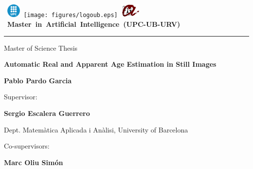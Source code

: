 \thispagestyle{empty}
\vspace*{-2cm}

\hbox{
\includegraphics[width=0.7cm]{figures/logoupc.eps}
\texttt{[image: figures/logoub.eps]}
\includegraphics[width=1cm]{figures/logourv.eps}
\Large \bf Master in Artificial Intelligence (UPC-UB-URV)}
\hrule

\bigskip\bigskip\bigskip

\begin{center}

{\LARGE Master of Science Thesis}

\bigskip\bigskip\bigskip\bigskip\bigskip

\textbf{\huge \bf Automatic Real and Apparent Age Estimation in Still Images}

\bigskip\bigskip\bigskip\bigskip\bigskip

{\LARGE \bf Pablo Pardo Garcia}

\end{center}
\vspace*{3cm}

\begin{center}
{\large Supervisor:}
\end{center}

\medskip %

{\Large\bf Sergio Escalera Guerrero}

\medskip %

{Dept. Matemàtica Aplicada i Anàlisi, University of Barcelona}

\medskip



\bigskip %

\begin{center}
{\large Co-supervisors:}
\end{center}
	
\medskip %

{\Large\bf Marc Oliu Simón}

\medskip %

